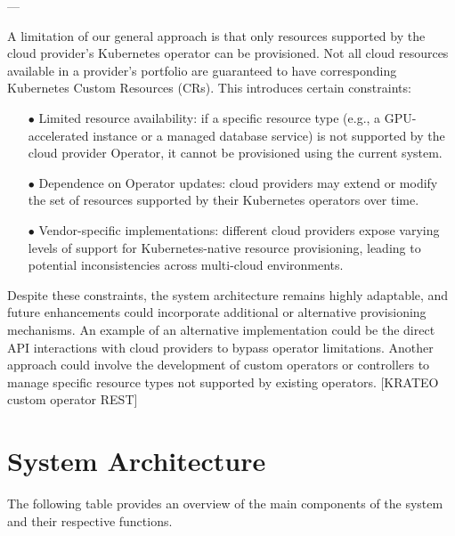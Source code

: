 ---






A limitation of our general approach is that only resources supported by the cloud provider’s Kubernetes operator can be provisioned. Not all cloud resources available in a provider’s portfolio are guaranteed to have corresponding Kubernetes Custom Resources (CRs). This introduces certain constraints:

\begin{itemize}[itemsep=0.2pt, topsep=1pt]
  \item[$\bullet$] Limited resource availability: if a specific resource type (e.g., a GPU-accelerated instance or a managed database service) is not supported by the cloud provider Operator, it cannot be provisioned using the current system.
  \item[$\bullet$] Dependence on Operator updates: cloud providers may extend or modify the set of resources supported by their Kubernetes operators over time.
  \item[$\bullet$] Vendor-specific implementations: different cloud providers expose varying levels of support for Kubernetes-native resource provisioning, leading to potential inconsistencies across multi-cloud environments.
\end{itemize}

Despite these constraints, the system architecture remains highly adaptable, and future enhancements could incorporate additional or alternative provisioning mechanisms. 
An example of an alternative implementation could be the direct API interactions with cloud providers to bypass operator limitations. Another approach could involve the development of custom operators or controllers to manage specific resource types not supported by existing operators. 
[KRATEO custom operator REST]

\newpage

\section{System Architecture}
\label{sec:system_architecture}

The following table provides an overview of the main components of the system and their respective functions.

